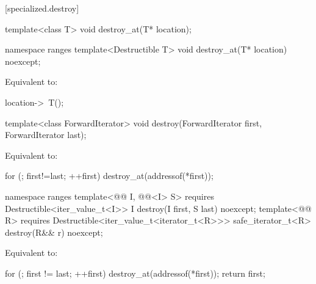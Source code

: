 [specialized.destroy]{}

%
\begin{itemdecl}
template<class T>
  void destroy_at(T* location);
\end{itemdecl}
\begin{addedblock}
\begin{itemdecl}
namespace ranges {
  template<Destructible T>
    void destroy_at(T* location) noexcept;
}
\end{itemdecl}
\end{addedblock}

\begin{itemdescr}
\pnum
\effects
Equivalent to:
\begin{codeblock}
location->~T();
\end{codeblock}
\end{itemdescr}

%
\begin{itemdecl}
template<class ForwardIterator>
  void destroy(ForwardIterator first, ForwardIterator last);
\end{itemdecl}

\begin{itemdescr}
\pnum
\effects
Equivalent to:
\begin{codeblock}
for (; first!=last; ++first)
  destroy_at(addressof(*first));
\end{codeblock}
\end{itemdescr}

\begin{addedblock}
%
\begin{itemdecl}
namespace ranges {
  template<@@ I, @@<I> S>
      requires Destructible<iter_value_t<I>>
    I destroy(I first, S last) noexcept;
  template<@@ R>
      requires Destructible<iter_value_t<iterator_t<R>>>
    safe_iterator_t<R> destroy(R&& r) noexcept;
}
\end{itemdecl}

\begin{itemdescr}
\pnum
\effects Equivalent to:
\begin{codeblock}
for (; first != last; ++first)
  destroy_at(addressof(*first));
return first;
\end{codeblock}
\end{itemdescr}
\end{addedblock}

